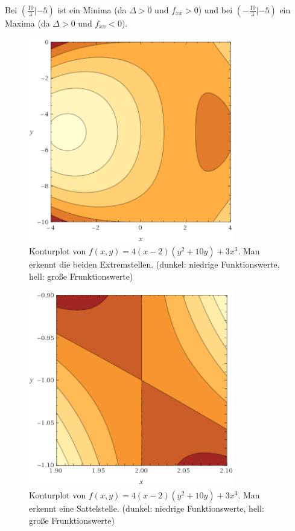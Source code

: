 Bei $(\frac{10}{3}|-5)$ ist ein Minima (da $\Delta > 0$ und $f_{xx} > 0$) und bei $(-\frac{10}{3}|-5)$ ein Maxima (da $\Delta > 0$ und $f_{xx} < 0$).

\begin{figure}[ht]
  \centering
  \includegraphics[width=0.8\textwidth]{../tex-snippets/ex-fn-extrema-6-img-c.png}
  \caption{Konturplot von $f(x,y) = 4(x-2)(y^2+10y)+3x^3$. Man erkennt die beiden Extremstellen. (dunkel: niedrige Funktionswerte, hell: große Frunktionswerte)}
  \label{ex-fn-extrema-6-img-c}
\end{figure}

\begin{figure}[ht]
  \centering
  \includegraphics[width=0.8\textwidth]{../tex-snippets/ex-fn-extrema-6-img-d.png}
  \caption{Konturplot von $f(x,y) = 4(x-2)(y^2+10y)+3x^3$. Man erkennt eine Sattelstelle. (dunkel: niedrige Funktionswerte, hell: große Frunktionswerte)}
  \label{ex-fn-extrema-6-img-d}
\end{figure}

